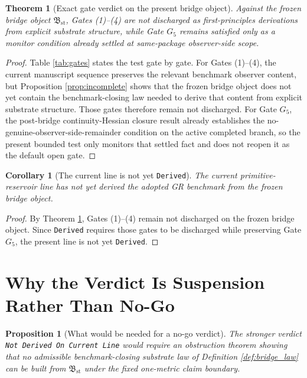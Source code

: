 \documentclass[11pt]{article}
\newcommand{\StableBridgeObject}{\mathfrak B_{\mathrm{st}}}
\newcommand{\GateFive}{G_{5}}
\newtheorem{proposition}{Proposition}
\newtheorem{corollary}{Corollary}
\newtheorem{theorem}{Theorem}
\begin{document}
\begin{theorem}[Exact gate verdict on the present bridge object]
\label{thm:gate_verdict}
Against the frozen bridge object \(\StableBridgeObject\), Gates (1)--(4) are not discharged as first-principles derivations from explicit substrate structure, while Gate \(\GateFive\) remains satisfied only as a monitor condition already settled at same-package observer-side scope.
\end{theorem}

\begin{proof}
Table \ref{tab:gates} states the test gate by gate. For Gates (1)--(4), the current manuscript sequence preserves the relevant benchmark observer content, but Proposition \ref{prop:incomplete} shows that the frozen bridge object does not yet contain the benchmark-closing law needed to derive that content from explicit substrate structure. Those gates therefore remain not discharged. For Gate \(\GateFive\), the post-bridge continuity-Hessian closure result already establishes the no-genuine-observer-side-remainder condition on the active completed branch, so the present bounded test only monitors that settled fact and does not reopen it as the default open gate.
\end{proof}

\begin{corollary}[The current line is not yet \texttt{Derived}]
\label{cor:not_derived_yet}
The current primitive-reservoir line has not yet derived the adopted GR benchmark from the frozen bridge object.
\end{corollary}

\begin{proof}
By Theorem \ref{thm:gate_verdict}, Gates (1)--(4) remain not discharged on the frozen bridge object. Since \texttt{Derived} requires those gates to be discharged while preserving Gate \(\GateFive\), the present line is not yet \texttt{Derived}.
\end{proof}

\section{Why the Verdict Is Suspension Rather Than No-Go}

\begin{proposition}[What would be needed for a no-go verdict]
\label{prop:no_go_need}
The stronger verdict \texttt{Not Derived On Current Line} would require an obstruction theorem showing that no admissible benchmark-closing substrate law of Definition \ref{def:bridge_law} can be built from \(\StableBridgeObject\) under the fixed one-metric claim boundary.
\end{proposition}
\end{document}
